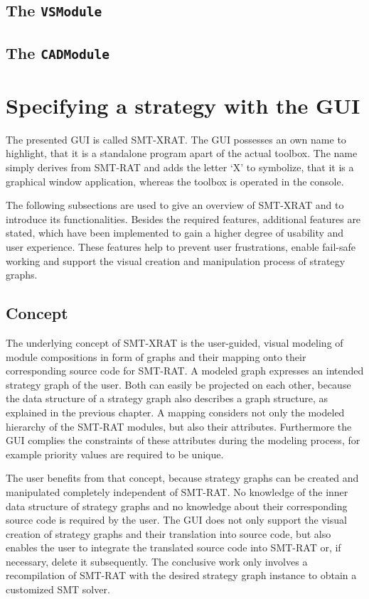 \subsection{The \texttt{VSModule}}

\subsection{The \texttt{CADModule}}


\section{Specifying a strategy with the GUI}

The presented GUI is called SMT-XRAT. The GUI possesses an own name to highlight, that it is a standalone program apart of the actual toolbox. The name simply derives from SMT-RAT and adds the letter `X' to symbolize, that it is a graphical window application, whereas the toolbox is operated in the console.

The following subsections are used to give an overview of SMT-XRAT and to introduce its functionalities. Besides the required features, additional features are stated, which have been implemented to gain a higher degree of usability and user experience. These features help to prevent user frustrations, enable fail-safe working and support the visual creation and manipulation process of strategy graphs.

\subsection{Concept}
\label{sec:concept_of_smt-xrat}
The underlying concept of SMT-XRAT is the user-guided, visual modeling of module compositions in form of graphs and their mapping onto their corresponding source code for SMT-RAT. A modeled graph expresses an intended strategy graph of the user. Both can easily be projected on each other, because the data structure of a strategy graph also describes a graph structure, as explained in the previous chapter. A mapping considers not only the modeled hierarchy of the SMT-RAT modules, but also their attributes. Furthermore the GUI complies the constraints of these attributes during the modeling process, for example priority values are required to be unique.

The user benefits from that concept, because strategy graphs can be created and manipulated completely independent of SMT-RAT. No knowledge of the inner data structure of strategy graphs and no knowledge about their corresponding source code is required by the user. The GUI does not only support the visual creation of strategy graphs and their translation into source code, but also enables the user to integrate the translated source code into SMT-RAT or, if necessary, delete it subsequently. The conclusive work only involves a recompilation of SMT-RAT with the desired strategy graph instance to obtain a customized SMT solver.

